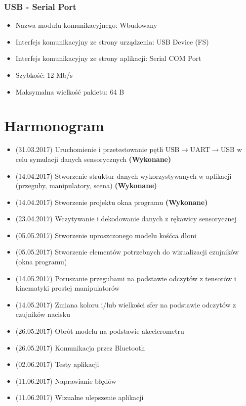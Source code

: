\documentclass[12pt,a4paper]{article}
\begin{document}
\subsubsection{USB - Serial Port}
\begin{itemize}
\item Nazwa modułu komunikacyjnego: Wbudowany
\item Interfejs komunikacyjny ze strony urządzenia: USB Device (FS)
\item Interfejs komunikacyjny ze strony aplikacji: Serial COM Port
\item Szybkość: 12 Mb/s
\item Maksymalna wielkość pakietu: 64 B
\end{itemize}

\newpage
\section{Harmonogram}
\begin{itemize}
\item (31.03.2017) Uruchomienie i przetestowanie pętli USB$\rightarrow $UART$\rightarrow $USB w celu symulacji danych sensorycznych \textbf{(Wykonane)}
\item (14.04.2017) Stworzenie struktur danych wykorzystywanych w aplikacji (przeguby, manipulatory, scena) \textbf{(Wykonane)}
\item (14.04.2017) Stworzenie projektu okna programu \textbf{(Wykonane)}
\item (23.04.2017) Wczytywanie i dekodowanie danych z rękawicy sensorycznej
\item (05.05.2017) Stworzenie uproszczonego modelu kośćca dłoni
\item (05.05.2017) Stworzenie elementów potrzebnych do wizualizacji czujników (okna programu)
\item (14.05.2017) Poruszanie przegubami na podstawie odczytów z tensorów i kinematyki prostej manipulatorów
\item (14.05.2017) Zmiana koloru i/lub wielkości sfer na podstawie odczytów z czujników nacisku
\item (26.05.2017) Obrót modelu na podstawie akcelerometru
\item (26.05.2017) Komunikacja przez Bluetooth
\item (02.06.2017) Testy aplikacji
\item (11.06.2017) Naprawianie błędów
\item (11.06.2017) Wizualne ulepszenie aplikacji
\end{itemize}


\end{document}
